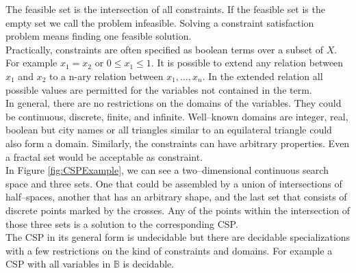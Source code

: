 The feasible set is the intersection of all constraints. If the feasible set is the empty set we call the problem infeasible. Solving a constraint satisfaction problem means finding one feasible solution.\\
Practically, constraints are often specified as boolean terms over a subset of $X$. For example $x_1=x_2$ or $0\leq x_1 \leq 1$. 
It is possible to extend any relation between $x_1$ and $x_2$ to a n-ary relation between $x_1,\dots,x_n$. In the extended relation all possible values are permitted for the variables not contained in the term.\\
In general, there are no restrictions on the domains of the variables. They could be continuous, discrete, finite, and infinite. Well--known domains are integer, real, boolean but city names or all triangles similar to an equilateral triangle could also form a domain. Similarly, the constraints can have arbitrary properties. Even a fractal set would be acceptable as constraint.\\
In Figure \ref{fig:CSPExample}, we can see a two--dimensional continuous search space and three sets. One that could be assembled by a union of intersections of half--spaces, another that has an arbitrary shape, and the last set that consists of discrete points marked by the crosses. Any of the points within the intersection of those three sets is a solution to the corresponding CSP.\\
The CSP in its general form is undecidable but there are decidable specializations with a few restrictions on the kind of constraints and domains. For example a CSP with all variables in $\mathbb{B}$ is decidable.


